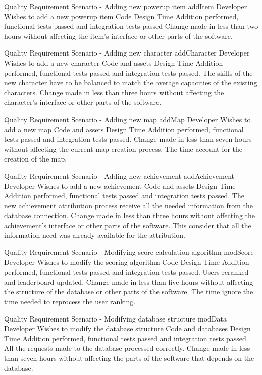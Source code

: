 {Quality Requirement Scenario - Adding new powerup item}
{addItem}
{Developer}
{Wishes to add a new powerup item}
{Code}
{Design Time}
{Addition performed, functional tests passed and integration tests passed}
{Change made in less than two hours without affecting the item’s interface or other parts of the software.}

{Quality Requirement Scenario - Adding new character}
{addCharacter}
{Developer}
{Wishes to add a new character}
{Code and assets}
{Design Time}
{Addition performed, functional tests passed and integration tests passed. The skills of the new character have to be balanced to match the average capacities of the existing characters.}
{Change made in less than three hours without affecting the character’s interface or other parts of the software.}

{Quality Requirement Scenario - Adding new map}
{addMap}
{Developer}
{Wishes to add a new map}
{Code and assets}
{Design Time}
{Addition performed, functional tests passed and integration tests passed.}
{Change made in less than seven hours without affecting the current map creation process. The time account for the creation of the map.}

{Quality Requirement Scenario - Adding new achievement}
{addAchievement}
{Developer}
{Wishes to add a new achievement}
{Code and assets}
{Design Time}
{Addition performed, functional tests passed and integration tests passed. The new achievement attribution process receive all the needed information from the database connection.}
{Change made in less than three hours without affecting the achievement’s interface or other parts of the software. This consider that all the information need was already available for the attribution.}

{Quality Requirement Scenario - Modifying score calculation algorithm}
{modScore}
{Developer}
{Wishes to modify the scoring algorithm}
{Code}
{Design Time}
{Addition performed, functional tests passed and integration tests passed. Users reranked and leaderboard updated.}
{Change made in less than five hours without affecting the structure of the database or other parts of the software. The time ignore the time needed to reprocess the user ranking.}

{Quality Requirement Scenario - Modifying database structure}
{modData}
{Developer}
{Wishes to modify the database structure}
{Code and databases}
{Design Time}
{Addition performed, functional tests passed and integration tests passed. All the requests made to the database processed correctly.}
{Change made in less than seven hours without affecting the parts of the software that depends on the database.}

